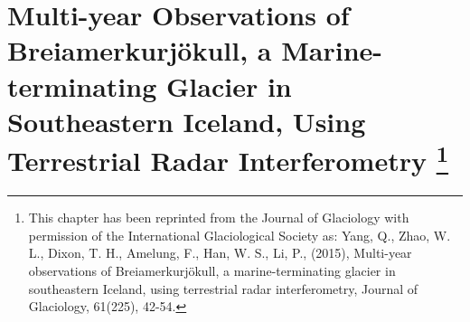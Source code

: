 % 
% 
% 
% 
% 
% 
% 
% 
% 
% 
% 
% 
% 
% 
% 

% 
\chapter[Multi-year Observations of Brei{\dh}amerkurjökull, a Marine-terminating Glacier in Southeastern Iceland, Using Terrestrial Radar Interferometry]{Multi-year Observations of Brei{\dh}amerkurjökull, a Marine-terminating Glacier in Southeastern Iceland, Using Terrestrial Radar Interferometry \footnote{This chapter has been reprinted from the Journal of Glaciology with permission of the International Glaciological Society as: Yang, Q., Zhao, W. L., Dixon, T. H., Amelung, F., Han, W. S., Li, P., (2015), Multi-year observations of Brei{\dh}amerkurjökull, a marine-terminating glacier in southeastern Iceland, using terrestrial radar interferometry, Journal of Glaciology, 61(225), 42-54.}}


